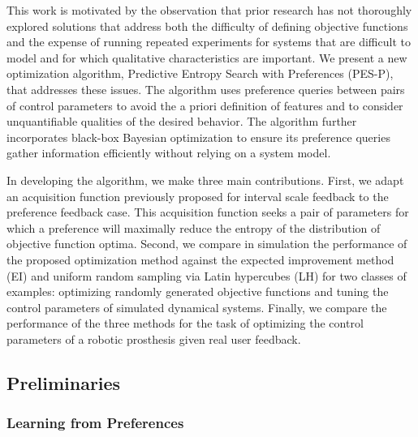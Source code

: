 This work is motivated by the observation that prior research has not
thoroughly explored solutions that address both the difficulty of defining
objective functions and the expense of running repeated experiments for systems
that are difficult to model and for which qualitative characteristics are
important. We present a new optimization algorithm, Predictive Entropy Search
with Preferences (PES-P), that addresses these issues. The algorithm uses
preference queries between pairs of control parameters to avoid the a priori
definition of features and to consider unquantifiable qualities of the desired
behavior. The algorithm further incorporates black-box Bayesian optimization to
ensure its preference queries gather information efficiently without relying on
a system model.

In developing the algorithm, we make three main contributions. First, we adapt
an acquisition function previously proposed for interval scale feedback to the
preference feedback case. This acquisition function seeks a pair of parameters
for which a preference will maximally reduce the entropy of the distribution of
objective function optima. Second, we compare in simulation the performance of
the proposed optimization method against the expected improvement method (EI)
and uniform random sampling via Latin hypercubes (LH) for two classes of
examples: optimizing randomly generated objective functions and tuning the
control parameters of simulated dynamical systems.  Finally, we compare the
performance of the three methods for the task of optimizing the control
parameters of a robotic prosthesis given real user feedback.

\subsection{Preliminaries} 
\subsubsection{Learning from Preferences}

